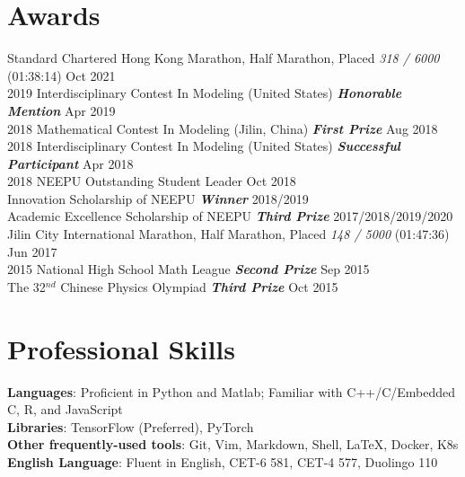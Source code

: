 \documentclass{my_cv}
\begin{document}
\hspace*{\fill} 
%


\section{Awards}

 Standard Chartered Hong Kong Marathon, Half Marathon, Placed \emph{318 / 6000} (01:38:14) \hfill Oct 2021\\
2019 Interdisciplinary Contest In Modeling (United States) \textbf{\emph{Honorable Mention}} \hfill Apr 2019\\
2018 Mathematical Contest In Modeling (Jilin, China) \textbf{\emph{First Prize}} \hfill Aug 2018\\
2018 Interdisciplinary Contest In Modeling (United States) \textbf{\emph{Successful Participant}} \hfill Apr 2018\\
2018 NEEPU Outstanding Student Leader \hfill Oct 2018\\
Innovation Scholarship of NEEPU \textbf{\emph{Winner}} \hfill 2018/2019\\
Academic Excellence Scholarship of NEEPU \textbf{\emph{Third Prize}} \hfill 2017/2018/2019/2020 \\
Jilin City International Marathon, Half Marathon, Placed \emph{148 / 5000} (01:47:36) \hfill Jun 2017\\
2015 National High School Math League \textbf{\emph{Second Prize}} \hfill Sep 2015\\
The 32$^{nd}$ Chinese Physics Olympiad \textbf{\emph{Third Prize}} \hfill Oct 2015

\hspace*{\fill}

\section{Professional Skills}

\noindent \textbf{Languages}: Proficient in Python and Matlab; Familiar with C++/C/Embedded C, R, and JavaScript \\
\textbf{Libraries}: TensorFlow (Preferred), PyTorch \\
\textbf{Other frequently-used tools}: Git, Vim, Markdown, Shell, \LaTeX, Docker, K8s \\
\textbf{English Language}: Fluent in English, CET-6 581, CET-4 577, Duolingo 110
\end{document}
